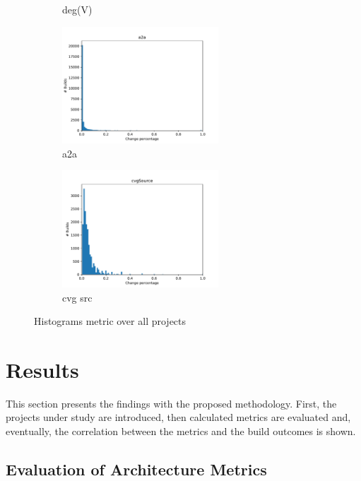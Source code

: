 \documentclass[sigplan, anonymous, review]{acmart}
\begin{document}
\begin{figure}[!t]
\begin{subfigure}{2.3in}
		\caption{deg(V)}
		\label{nodDegHist}
	\end{subfigure}%
	\begin{subfigure}{2.3in}
		\centering
		\includegraphics[width=2.3in]{assets/a2a.pdf}
		\caption{a2a}
		\label{a2aHist}
	\end{subfigure}%
	\begin{subfigure}{2.3in}
		\centering
		\includegraphics[width=2.3in]{assets/cvgSource.pdf}
		\caption{cvg src}
		\label{cvgHist}
	\end{subfigure}
	\caption{Histograms metric over all projects}
	\label{fig:histograms}
	
\end{figure}

\section{Results}

This section presents the findings with the proposed methodology. First, the projects under study are introduced, then calculated metrics are evaluated and, eventually, the correlation between the metrics and the build outcomes is shown.

\subsection{Evaluation of Architecture Metrics}


\end{document}

